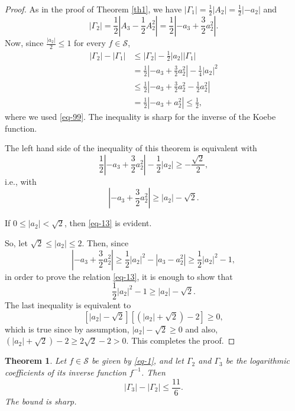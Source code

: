 \documentclass{amsart}
\newtheorem{thm}{Theorem}
\begin{document}
\medskip

\begin{proof}
As in the proof of Theorem \ref{th1}, we have $ |\Gamma_{1}|=\frac{1}{2}|A_{2}|=\frac{1}{2}|-a_{2}|$ and
$$|\Gamma_{2}|=\frac{1}{2}\left|A_{3}-\frac{1}{2}A_{2}^{2} \right|=\frac{1}{2}\left|-a_{3}+\frac{3}{2}a_{2}^{2}\right|.$$
Now, since $\frac{|a_{2}|}{2}\leq 1$ for every $f\in \mathcal{S}$, 
\[
\begin{split}
|\Gamma_{2}|-|\Gamma_{1}|&\leq|\Gamma_{2}|-\frac{1}{2}|a_{2}||\Gamma_{1}|\\
&= \frac{1}{2}\left|-a_{3}+\frac{3}{2}a_{2}^{2}\right|-\frac{1}{4}|a_{2}|^{2}\\
&\leq \frac{1}{2}\left|-a_{3}+\frac{3}{2}a_{2}^{2}-\frac{1}{2}a_{2}^{2}\right|\\
&=\frac{1}{2}|-a_{3}+a_{2}^{2}|\leq \frac{1}{2},
\end{split}
\]
where we used \eqref{eq-99}. The inequality is sharp for the inverse of the Koebe function.

\medskip

The left hand side of the inequality of this theorem is equivalent with
$$\frac{1}{2}\left|-a_{3}+\frac{3}{2}a_{2}^{2}\right|-\frac{1}{2}|a_{2}|\geq  -\frac{\sqrt{2}}{2},$$
i.e., with
\begin{equation}\label{eq-13}
\left|-a_{3}+\frac{3}{2}a_{2}^{2}\right|\geq|a_{2}| -\sqrt{2}.
\end{equation}

\medskip

If $0\leq |a_{2}|<\sqrt{2}$, then \eqref{eq-13} is evident. 

\medskip

So, let $\sqrt{2}\leq |a_{2}|\leq2$.
Then, since
$$\left|-a_{3}+\frac{3}{2}a_{2}^{2}\right|\geq\frac{1}{2}|a_{2}|^{2}-|a_{3}-a_{2}^{2}|\geq\frac{1}{2}|a_{2}|^{2}-1,$$
in order to prove the relation  \eqref{eq-13}, it is enough to show that
$$ \frac{1}{2}|a_{2}|^{2}-1\geq |a_{2}| -\sqrt{2}.$$
The last inequality is equivalent to
$$\left[|a_{2}| -\sqrt{2}\right] \left[\left(|a_{2}| +\sqrt{2}\right)-2\right]\geq0,$$
which is true since by assumption, $|a_{2}| -\sqrt{2}\geq 0$  and also, $\left(|a_{2}| +\sqrt{2}\right)-2\geq 2\sqrt{2}-2>0$.
This completes the proof.
\end{proof}

\medskip

\begin{thm}\label{th3}
Let $f\in\mathcal{S}$ be given by \eqref{eq-1}, and let $\Gamma_{2}$ and $\Gamma_{3}$
be the  logarithmic coefficients of its inverse function $f^{-1}$. Then
$$ |\Gamma_{3}|-|\Gamma_{2}|\leq\frac{11}{6}.$$
The bound is sharp.
\end{thm}
\end{document}
